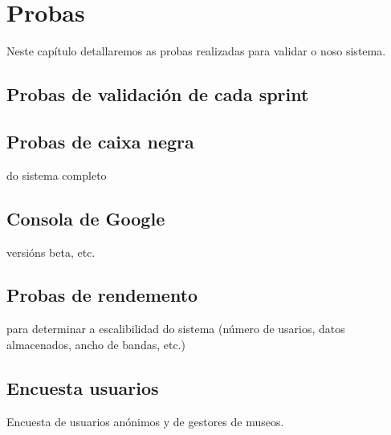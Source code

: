 \chapter{Probas}

Neste capítulo detallaremos as probas realizadas para validar o noso sistema.



\section{Probas de validación de cada sprint}


\section{Probas de caixa negra}

do sistema completo


\section{Consola de Google}

versións beta, etc.

\section{Probas de rendemento}

para determinar a escalibilidad do sistema (número de usarios, datos almacenados, ancho de bandas, etc.)


\section{Encuesta usuarios}

Encuesta de usuarios anónimos y de gestores de museos.


